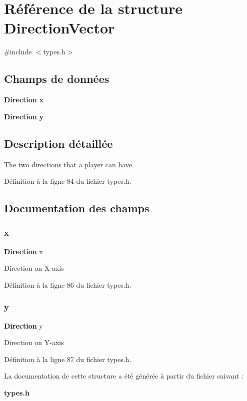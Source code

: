 \section{Référence de la structure Direction\+Vector}
\label{struct_direction_vector}


{\ttfamily \#include $<$types.\+h$>$}

\subsection*{Champs de données}
\begin{DoxyCompactItemize}
\item 
\textbf{ Direction} \textbf{ x}
\item 
\textbf{ Direction} \textbf{ y}
\end{DoxyCompactItemize}


\subsection{Description détaillée}
The two directions that a player can have. 

Définition à la ligne 84 du fichier types.\+h.



\subsection{Documentation des champs}
\mbox{\label{struct_direction_vector_a85498197c1f15e252369d395dbe481a3}} 
\subsubsection{x}
{\footnotesize\ttfamily \textbf{ Direction} x}

Direction on X-\/axis 

Définition à la ligne 86 du fichier types.\+h.

\mbox{\label{struct_direction_vector_a30d9ea60c1959d5dd6921f7a2e7769c1}} 
\subsubsection{y}
{\footnotesize\ttfamily \textbf{ Direction} y}

Direction on Y-\/axis 

Définition à la ligne 87 du fichier types.\+h.



La documentation de cette structure a été générée à partir du fichier suivant \+:\begin{DoxyCompactItemize}
\item 
\textbf{ types.\+h}\end{DoxyCompactItemize}
